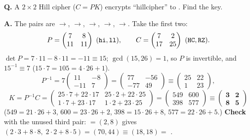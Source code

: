 \begin{worked}
\textbf{Q.} A $2\times2$ Hill cipher ($C = PK$) encrypts ``hillcipher'' to . Find the key.

\textbf{A.} The pairs are $\to$, $\to$, $\to$, $\to$, $\to$. Take the first two:
\[
P = \begin{pmatrix}7&8\\11&11\end{pmatrix}\ (\ttx{hi}, \ttx{ll}),\qquad C = \begin{pmatrix}7&2\\17&25\end{pmatrix}\ (\ttx{HC}, \ttx{RZ}).
\]
$\det P = 7\cdot11 - 8\cdot11 = -11 \equiv 15$; $\gcd(15, 26) = 1$, so $P$ is invertible, and $15^{-1} \equiv 7$ ($15\cdot7 = 105 = 4\cdot26 + 1$).
\[
P^{-1} = 7\begin{pmatrix}11&-8\\-11&7\end{pmatrix} = \begin{pmatrix}77&-56\\-77&49\end{pmatrix} \equiv \begin{pmatrix}25&22\\1&23\end{pmatrix},
\]
\[
K = P^{-1}C = \begin{pmatrix}25\cdot7+22\cdot17 & 25\cdot2+22\cdot25\\ 1\cdot7+23\cdot17 & 1\cdot2+23\cdot25\end{pmatrix} = \begin{pmatrix}549&600\\398&577\end{pmatrix} \equiv \mathbf{\begin{pmatrix}3&2\\8&5\end{pmatrix}}
\]
($549 = 21\cdot26 + 3$, $600 = 23\cdot26 + 2$, $398 = 15\cdot26 + 8$, $577 = 22\cdot26 + 5$.) \textbf{Check} with the unused third pair:  $= (2, 8)$ gives $(2\cdot3 + 8\cdot8,\; 2\cdot2 + 8\cdot5) = (70, 44) \equiv (18, 18) =$  \checkmark.
\end{worked}

